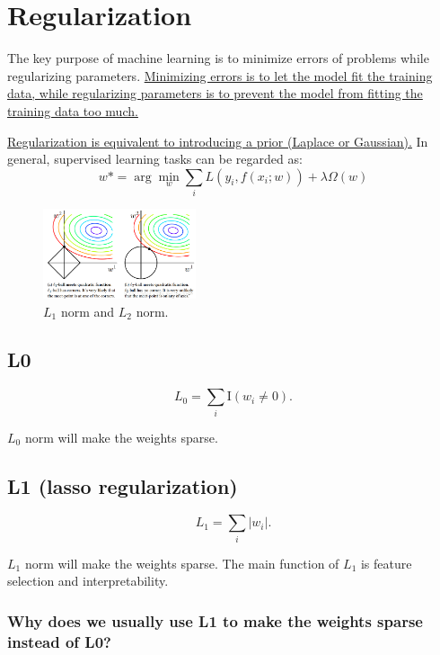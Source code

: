 \documentclass[10pt,onecolumn]{book}
\begin{document}
\section{Regularization}

The key purpose of machine learning is to minimize errors of problems while regularizing parameters. \uline{Minimizing errors is to let the model fit the training data, while regularizing parameters is to prevent the model from fitting the training data too much.} 

\uline{Regularization is equivalent to introducing a prior (Laplace or Gaussian).}
In general, supervised learning tasks can be regarded as:
\begin{equation}
w* = \arg\min_w \sum_i L(y_i, f(x_i; w)) + \lambda \Omega(w)
\end{equation}

\begin{figure}[h]
\centering
\includegraphics[width=0.4\textwidth]{figures/l1_l2.png}
\caption{$L_1$ norm and $L_2$ norm.}
\end{figure}


\subsection{L0}
\begin{equation}
L_0 = \sum_i \text{I}(w_i \neq 0).
\end{equation}

$L_0$ norm will make the weights sparse.

\subsection{L1 (lasso regularization)}
\begin{equation}
L_1 = \sum_i |w_i|.
\end{equation}

$L_1$ norm will make the weights sparse. The main function of $L_1$ is feature selection and interpretability.

\subsubsection{Why does we usually use L1 to make the weights sparse instead of L0?}
\end{document}
